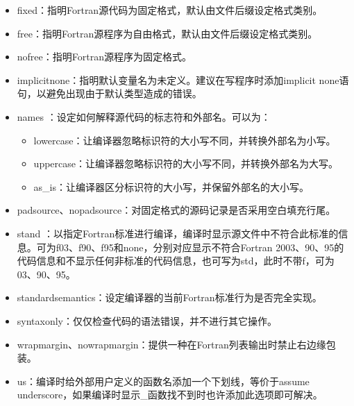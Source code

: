 \documentclass[a4paper,12pt,english]{sphinxmanual}
\begin{document}
\begin{itemize}
\item {} 
\sphinxAtStartPar
\sphinxhyphen{}fixed：指明Fortran源代码为固定格式，默认由文件后缀设定格式类别。

\item {} 
\sphinxAtStartPar
\sphinxhyphen{}free：指明Fortran源程序为自由格式，默认由文件后缀设定格式类别。

\item {} 
\sphinxAtStartPar
\sphinxhyphen{}nofree：指明Fortran源程序为固定格式。

\item {} 
\sphinxAtStartPar
\sphinxhyphen{}implicitnone：指明默认变量名为未定义。建议在写程序时添加implicit none语句，以避免出现由于默认类型造成的错误。

\item {} 
\sphinxAtStartPar
\sphinxhyphen{}names ：设定如何解释源代码的标志符和外部名。可以为：
\begin{itemize}
\item {} 
\sphinxAtStartPar
lowercase：让编译器忽略标识符的大小写不同，并转换外部名为小写。

\item {} 
\sphinxAtStartPar
uppercase：让编译器忽略标识符的大小写不同，并转换外部名为大写。

\item {} 
\sphinxAtStartPar
as\_is：让编译器区分标识符的大小写，并保留外部名的大小写。

\end{itemize}

\item {} 
\sphinxAtStartPar
\sphinxhyphen{}pad\sphinxhyphen{}source、\sphinxhyphen{}nopad\sphinxhyphen{}source：对固定格式的源码记录是否采用空白填充行尾。

\item {} 
\sphinxAtStartPar
\sphinxhyphen{}stand ：以指定Fortran标准进行编译，编译时显示源文件中不符合此标准的信息。可为f03、f90、f95和none，分别对应显示不符合Fortran
2003、90、95的代码信息和不显示任何非标准的代码信息，也可写为\sphinxhyphen{}std，此时不带f，可为03、90、95。

\item {} 
\sphinxAtStartPar
\sphinxhyphen{}standard\sphinxhyphen{}semantics：设定编译器的当前Fortran标准行为是否完全实现。

\item {} 
\sphinxAtStartPar
\sphinxhyphen{}syntax\sphinxhyphen{}only：仅仅检查代码的语法错误，并不进行其它操作。

\item {} 
\sphinxAtStartPar
\sphinxhyphen{}wrap\sphinxhyphen{}margin、\sphinxhyphen{}no\sphinxhyphen{}wrap\sphinxhyphen{}margin：提供一种在Fortran列表输出时禁止右边缘包装。

\item {} 
\sphinxAtStartPar
\sphinxhyphen{}us：编译时给外部用户定义的函数名添加一个下划线，等价于\sphinxhyphen{}assume
underscore，如果编译时显示\_函数找不到时也许添加此选项即可解决。

\end{itemize}
\end{document}
